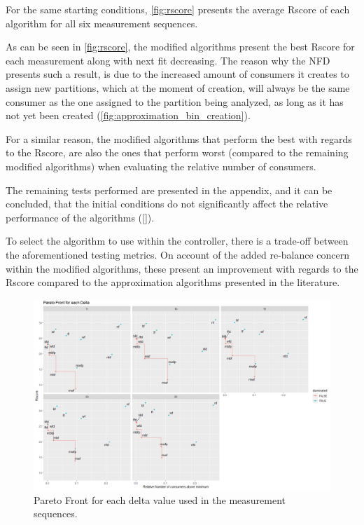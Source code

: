 For the same starting conditions, \ref{fig:rscore} presents the average Rscore of each algorithm for all six measurement sequences.

As can be seen in \ref{fig:rscore}, the modified algorithms present the best Rscore for each measurement along with next fit decreasing. The reason why the NFD presents such a result, is due to the increased amount of consumers it creates to assign new partitions, which at the moment of creation, will always be the same consumer as the one assigned to the partition being analyzed, as long as it has not yet been created (\ref{fig:approximation_bin_creation}).

For a similar reason, the modified algorithms that perform the best with regards to the Rscore, are also the ones that perform worst (compared to the remaining modified algorithms) when evaluating the relative number of consumers.

The remaining tests performed are presented in the appendix, and it can be concluded, that the initial conditions do not significantly affect the relative performance of the algorithms (\ref{}).

To select the algorithm to use within the controller, there is a trade-off between the aforementioned testing metrics. On account of the added re-balance concern within the modified algorithms, these present an improvement with regards to the Rscore compared to the approximation algorithms presented in the literature.

\begin{figure}[H]
    \centering
    \includegraphics[width=\textwidth]{images/controller/Facet Wrap Pareto Front.png}
\caption{Pareto Front for each delta value used in the measurement sequences.}
\label{fig:pareto_front}
\end{figure}

